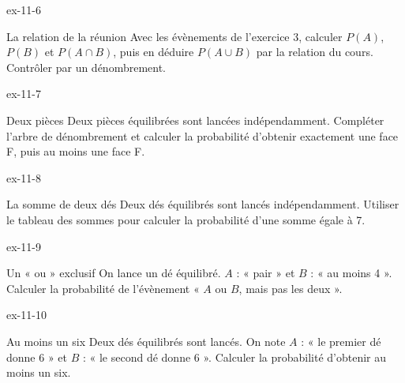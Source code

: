 \clearpage{}
\begin{blocLivre}{ex-11-6}\begin{exercice}[2]{La relation de la réunion}
Avec les évènements de l’exercice 3, calculer $P(A)$, $P(B)$ et $P(A\cap B)$, puis en déduire $P(A\cup B)$ par la relation du cours. Contrôler par un dénombrement.
\end{exercice}\end{blocLivre}
\begin{blocLivre}{ex-11-7}\begin{exercice}[2]{Deux pièces}
Deux pièces équilibrées sont lancées indépendamment. Compléter l’arbre de dénombrement et calculer la probabilité d’obtenir exactement une face F, puis au moins une face F.
\label{fig-ex-11-7}
\end{exercice}\end{blocLivre}
\begin{blocLivre}{ex-11-8}\begin{exercice}[2]{La somme de deux dés}
Deux dés équilibrés sont lancés indépendamment. Utiliser le tableau des sommes pour calculer la probabilité d’une somme égale à 7.
\label{fig-ex-11-8}
\end{exercice}\end{blocLivre}
\begin{blocLivre}{ex-11-9}\begin{exercice}[2]{Un « ou » exclusif}
On lance un dé équilibré. $A$ : « pair » et $B$ : « au moins 4 ». Calculer la probabilité de l’évènement « $A$ ou $B$, mais pas les deux ».
\end{exercice}\end{blocLivre}
\begin{blocLivre}{ex-11-10}\begin{exercice}[2]{Au moins un six}
Deux dés équilibrés sont lancés. On note $A$ : « le premier dé donne 6 » et $B$ : « le second dé donne 6 ». Calculer la probabilité d’obtenir au moins un six.
\label{fig-ex-11-10}
\end{exercice}\end{blocLivre}

